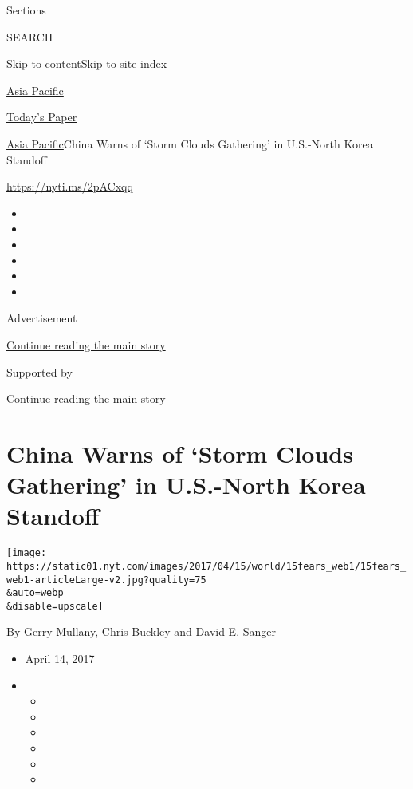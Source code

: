 Sections

SEARCH

\protect\hyperlink{site-content}{Skip to
content}\protect\hyperlink{site-index}{Skip to site index}

\href{https://www.nytimes.com/section/world/asia}{Asia Pacific}

\href{https://myaccount.nytimes.com/auth/login?response_type=cookie\&client_id=vi}{}

\href{https://www.nytimes.com/section/todayspaper}{Today's Paper}

\href{/section/world/asia}{Asia Pacific}\textbar{}China Warns of `Storm
Clouds Gathering' in U.S.-North Korea Standoff

\url{https://nyti.ms/2pACxqq}

\begin{itemize}
\item
\item
\item
\item
\item
\item
\end{itemize}

Advertisement

\protect\hyperlink{after-top}{Continue reading the main story}

Supported by

\protect\hyperlink{after-sponsor}{Continue reading the main story}

\hypertarget{china-warns-of-storm-clouds-gathering-in-us-north-korea-standoff}{%
\section{China Warns of `Storm Clouds Gathering' in U.S.-North Korea
Standoff}\label{china-warns-of-storm-clouds-gathering-in-us-north-korea-standoff}}

\texttt{[image: https://static01.nyt.com/images/2017/04/15/world/15fears\_web1/15fears\_web1-articleLarge-v2.jpg?quality=75\\\&auto=webp\\\&disable=upscale]}

By \href{http://www.nytimes.com/by/gerry-mullany}{Gerry Mullany},
\href{http://www.nytimes.com/by/chris-buckley}{Chris Buckley} and
\href{http://www.nytimes.com/by/david-e-sanger}{David E. Sanger}

\begin{itemize}
\item
  April 14, 2017
\item
  \begin{itemize}
  \item
  \item
  \item
  \item
  \item
  \item
  \end{itemize}
\end{itemize}

